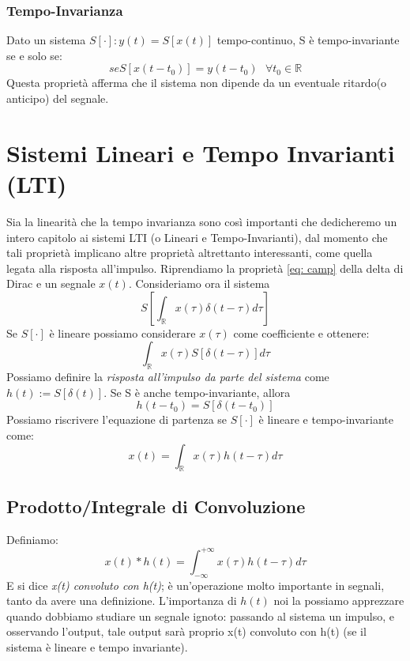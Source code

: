 \subsubsection{Tempo-Invarianza}
Dato un sistema $S[\cdot] : y(t) = S[x(t)]$ tempo-continuo, S è tempo-invariante se e solo se:\\
\begin{equation}
    se S[x(t - t_0)] = y(t - t_0) \mbox{   } \forall t_0 \in \mathbb{R}
\end{equation}
Questa proprietà afferma che il sistema non dipende da un eventuale ritardo(o anticipo) del segnale.


\section{Sistemi Lineari e Tempo Invarianti (LTI)}
Sia la linearità che la tempo invarianza sono così importanti che dedicheremo un intero capitolo ai sistemi LTI (o Lineari e Tempo-Invarianti), dal momento
che tali proprietà implicano altre proprietà altrettanto interessanti, come quella legata alla risposta all'impulso.
Riprendiamo la proprietà \eqref{eq: camp} della delta di Dirac e un segnale $x(t)$. Consideriamo ora il sistema
\begin{equation*}
    S\left[\int_{\mathbb{R}}x(\tau)\delta(t - \tau) d\tau\right]
\end{equation*}
Se $S[\cdot]$ è lineare possiamo considerare $x(\tau)$ come coefficiente e ottenere:
\begin{equation}
    \int_{\mathbb{R}}x(\tau) S\left[\delta(t - \tau) \right]d\tau
\end{equation}
Possiamo definire la \textit{risposta all'impulso da parte del sistema} come $h(t) := S[\delta(t)]$.
Se S è anche tempo-invariante, allora
\begin{equation}
    h(t - t_0) = S[\delta(t - t_0)]
\end{equation}
Possiamo riscrivere l'equazione di partenza se $S[\cdot]$ è lineare e tempo-invariante come:
\begin{equation}
    x(t) = \int_{\mathbb{R}}x(\tau)h(t - \tau) d\tau
\end{equation}

\subsection{Prodotto/Integrale di Convoluzione}
Definiamo:
\begin{equation}
    x(t) \ast h(t) = \int_{-\infty}^{+\infty} x(\tau)h(t - \tau) d\tau
\end{equation}
E si dice \textit{x(t) convoluto con h(t)}; è un'operazione molto importante in segnali, tanto da avere una definizione.
L'importanza di $h(t)$ noi la possiamo apprezzare quando dobbiamo studiare un segnale ignoto: passando al sistema un impulso, 
e osservando l'output, tale output sarà proprio x(t) convoluto con h(t) (se il sistema è lineare e tempo invariante).
